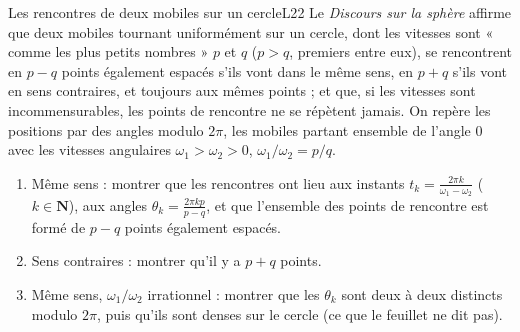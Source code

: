 \documentclass[11pt,a4paper]{article}
\begin{document}
\begin{exercice}{Les rencontres de deux mobiles sur un cercle}{L2}{2}
Le \emph{Discours sur la sphère} affirme que deux mobiles tournant uniformément
sur un cercle, dont les vitesses sont « comme les plus petits nombres » $p$ et
$q$ ($p > q$, premiers entre eux), se rencontrent en $p - q$ points également
espacés s'ils vont dans le même sens, en $p + q$ s'ils vont en sens contraires,
et toujours aux mêmes points ; et que, si les vitesses sont incommensurables,
les points de rencontre ne se répètent jamais. On repère les positions par des
angles modulo $2\pi$, les mobiles partant ensemble de l'angle $0$ avec les
vitesses angulaires $\omega_1 > \omega_2 > 0$, $\omega_1/\omega_2 = p/q$.
\begin{enumerate}
\item Même sens : montrer que les rencontres ont lieu aux instants
  $t_k = \frac{2\pi k}{\omega_1 - \omega_2}$ ($k \in \mathbf{N}$), aux angles
  $\theta_k = \frac{2\pi k p}{p - q}$, et que l'ensemble des points de rencontre
  est formé de $p - q$ points également espacés.
\item Sens contraires : montrer qu'il y a $p + q$ points.
\item Même sens, $\omega_1/\omega_2$ irrationnel : montrer que les $\theta_k$
  sont deux à deux distincts modulo $2\pi$, puis qu'ils sont denses sur le cercle
  (ce que le feuillet ne dit pas).
\end{enumerate}
\end{exercice}
\end{document}
